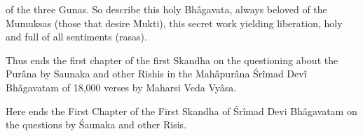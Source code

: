 of the three Gunas. So describe this holy Bh\^agavata, always beloved of the Mumuksas (those that desire Mukti), this secret work yielding liberation, holy and full of all sentiments (rasas).

Thus ends the first chapter of the first Skandha on the questioning about the Pur\^ana by Saunaka and other Rishis in the Mah\^apur\^ana \'Sr\^imad Dev\^i Bh\^agavatam of 18,000 verses by Maharsi Veda Vy\^asa.

Here ends the First Chapter of the First Skandha of \'Sr\^imad Devi Bh\^agavatam on the questions by \'Saunaka and other Risis.